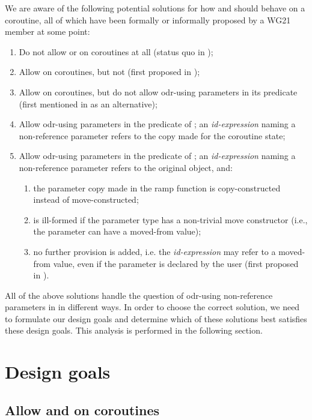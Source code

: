 We are aware of the following potential solutions for how  and  should behave on a coroutine, all of which have been formally or informally proposed by a WG21 member at some point:
\begin{enumerate}
\item Do not allow  or  on coroutines at all (status quo in \cite{P2900R8});
\item Allow  on coroutines, but not  (first proposed in \cite{P2957R1});
\item Allow  on coroutines, but do not allow odr-using parameters in its predicate (first mentioned in \cite{P2957R1} as an alternative);
\item Allow odr-using parameters in the predicate of ; an \emph{id-expression} naming a non-reference parameter refers to the copy made for the coroutine state;
\item Allow odr-using parameters in the predicate of ; an \emph{id-expression} naming a non-reference parameter refers to the original object, and:
\begin{enumerate}[label=\alph*.,ref=\theenumi\alph*]
        \item the parameter copy made in the ramp function is copy-constructed instead of move-constructed;
        \item is ill-formed if the parameter type has a non-trivial move constructor (i.e., the parameter can have a moved-from value);
        \item no further provision is added, i.e. the \emph{id-expression} may refer to a moved-from value, even if the parameter is declared  by the user (first proposed in \cite{P2957R0}).
\end{enumerate}
\end{enumerate}
All of the above solutions handle the question of odr-using non-reference parameters in  in different ways. In order to choose the correct solution, we need to formulate our design goals and determine which of these solutions best satisfies these design goals. This analysis is performed in the following section.

\section{Design goals}

\subsection{Allow  and  on coroutines}

